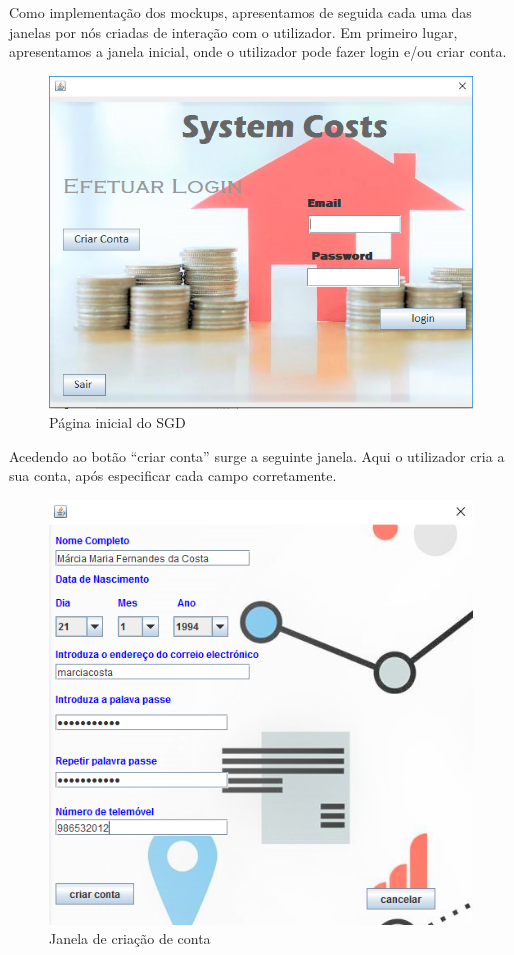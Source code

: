 Como implementação dos mockups, apresentamos de seguida cada uma das janelas por nós criadas de interação com o utilizador.
Em primeiro lugar, apresentamos a janela inicial, onde o utilizador pode fazer login e/ou criar conta. 

\begin{figure}[h!]
	\centering
	\includegraphics[scale=0.6]{imagens/interface/inicial}  
	\caption{Página inicial do SGD }  
\end{figure}

Acedendo ao botão “criar conta” surge a seguinte janela. Aqui o utilizador cria a sua conta, após especificar cada campo corretamente.

\begin{figure}[h!]
	\centering
	\includegraphics[scale=0.6]{imagens/interface/criarconta}  
	\caption{Janela de criação de conta}  
\end{figure}

